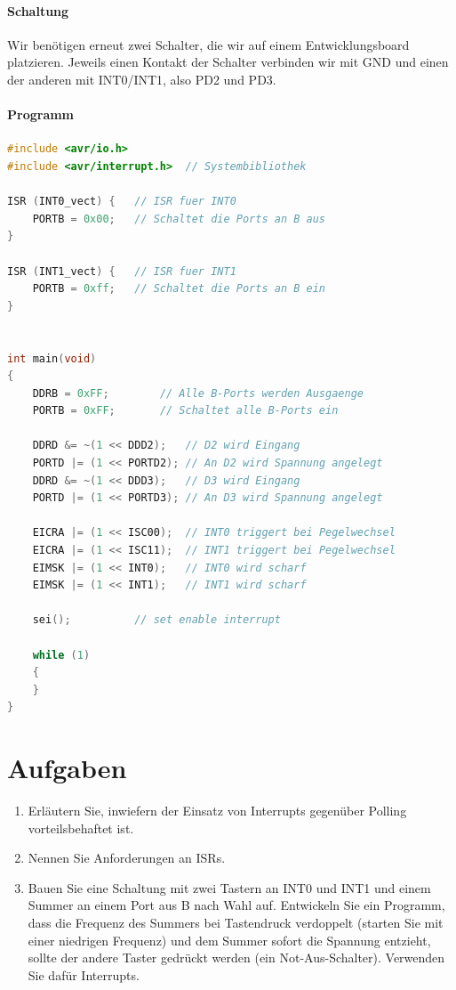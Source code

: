 \documentclass[11pt,a4paper]{scrartcl}
\begin{document}
\paragraph{Schaltung}
Wir benötigen erneut zwei Schalter, die wir auf einem Entwicklungsboard platzieren. Jeweils einen Kontakt der Schalter verbinden wir mit GND und einen der anderen mit INT0/INT1, also PD2 und PD3.
\paragraph{Programm}\quad
\begin{lstlisting}[language=C]
#include <avr/io.h>
#include <avr/interrupt.h>	// Systembibliothek

ISR (INT0_vect) {	// ISR fuer INT0
	PORTB = 0x00;	// Schaltet die Ports an B aus
}			

ISR (INT1_vect) {	// ISR fuer INT1
	PORTB = 0xff;	// Schaltet die Ports an B ein
}


int main(void)
{
	DDRB = 0xFF;		// Alle B-Ports werden Ausgaenge
	PORTB = 0xFF;		// Schaltet alle B-Ports ein 
	
	DDRD &= ~(1 << DDD2); 	// D2 wird Eingang
	PORTD |= (1 << PORTD2);	// An D2 wird Spannung angelegt
	DDRD &= ~(1 << DDD3);	// D3 wird Eingang
	PORTD |= (1 << PORTD3);	// An D3 wird Spannung angelegt
	
	EICRA |= (1 << ISC00);	// INT0 triggert bei Pegelwechsel
	EICRA |= (1 << ISC11);	// INT1 triggert bei Pegelwechsel
	EIMSK |= (1 << INT0);	// INT0 wird scharf
	EIMSK |= (1 << INT1);	// INT1 wird scharf
	
	sei();			// set enable interrupt
	
    while (1) 
    {
    }
}
\end{lstlisting}
\section*{Aufgaben}
\begin{enumerate}
\item Erläutern Sie, inwiefern der Einsatz von Interrupts gegenüber Polling vorteilsbehaftet ist.
\item Nennen Sie Anforderungen an ISRs.
\item Bauen Sie eine Schaltung mit zwei Tastern an INT0 und INT1 und einem Summer an einem Port aus B nach Wahl auf. Entwickeln Sie ein Programm, dass die Frequenz des Summers bei Tastendruck verdoppelt (starten Sie mit einer niedrigen Frequenz) und dem Summer sofort die Spannung entzieht, sollte der andere Taster gedrückt werden (ein Not-Aus-Schalter). Verwenden Sie dafür Interrupts.
\end{enumerate}
\end{document}

